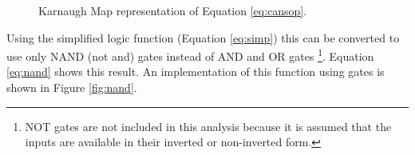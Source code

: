 \documentclass[12pt]{article}
\begin{document}
\begin{figure}[!hbt]
\begin{center}







\end{center}
\caption{Karnaugh Map representation of Equation \ref{eq:cansop}.}
\label{fig:karnmap}
\end{figure}

Using the simplified logic function (Equation \ref{eq:simp}) this
can be converted to use only NAND (not and) gates instead of AND and OR gates
\footnote{NOT gates are not included in this analysis because it
is assumed that the inputs are available in their inverted or non-inverted form.}.
Equation \ref{eq:nand} shows this result.
An implementation of this function using gates is shown in Figure \ref{fig:nand}.
\end{document}

